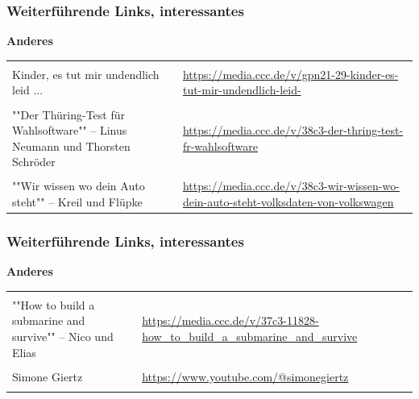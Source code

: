 \begin{frame}
    \frametitle{Weiterführende Links, interessantes}

    \textbf{\large Anderes}

    \begin{table}[H]
        \begin{tabularx}{\linewidth}{|lX|}
            &\\
            Kinder, es tut mir undendlich leid ...  &\url{https://media.ccc.de/v/gpn21-29-kinder-es-tut-mir-undendlich-leid-}\\
            &\\
            \parbox{.4\linewidth}{""Der Thüring-Test für Wahlsoftware"" -- Linus Neumann und Thorsten Schröder}&\url{https://media.ccc.de/v/38c3-der-thring-test-fr-wahlsoftware}\\
            &\\
            \parbox{.4\linewidth}{""Wir wissen wo dein Auto steht"" -- Kreil und Flüpke}&\url{https://media.ccc.de/v/38c3-wir-wissen-wo-dein-auto-steht-volksdaten-von-volkswagen}
        \end{tabularx}
    \end{table}
\end{frame}
\begin{frame}
    \frametitle{Weiterführende Links, interessantes}

    \textbf{\large Anderes}

    \begin{table}[H]
        \begin{tabularx}{\linewidth}{|lX|}
            &\\
            \parbox{.4\linewidth}{""How to build a submarine and survive"" -- Nico und Elias} &\parbox{.55\linewidth}{\url{https://media.ccc.de/v/37c3-11828-how\_to\_build\_a\_submarine\_and\_survive}}\\
            &\\
            Simone Giertz & \url{https://www.youtube.com/@simonegiertz}\\
            &\\
        \end{tabularx}
    \end{table}

\end{frame}

